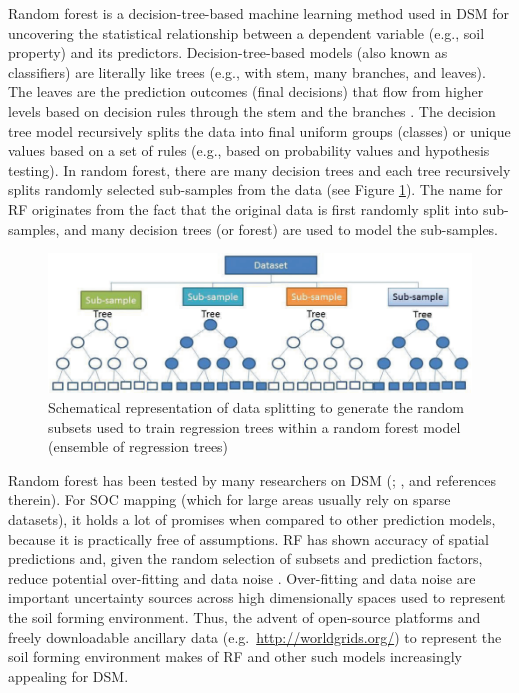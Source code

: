 \documentclass[10pt,b5paper,]{book}
\theoremstyle{definition}
\theoremstyle{definition}
\theoremstyle{definition}
\theoremstyle{remark}
\begin{document}
Random forest is a decision-tree-based machine learning method used in
DSM for uncovering the statistical relationship between a dependent
variable (e.g., soil property) and its predictors. Decision-tree-based
models (also known as classifiers) are literally like trees (e.g., with
stem, many branches, and leaves). The leaves are the prediction outcomes
(final decisions) that flow from higher levels based on decision rules
through the stem and the branches \citep{breiman1984classification}. The
decision tree model recursively splits the data into final uniform
groups (classes) or unique values based on a set of rules (e.g., based
on probability values and hypothesis testing). In random forest, there
are many decision trees and each tree recursively splits randomly
selected sub-samples from the data (see Figure \ref{fig:rfschema}). The
name for RF originates from the fact that the original data is first
randomly split into sub-samples, and many decision trees (or forest) are
used to model the sub-samples.

\begin{figure}

{\centering \includegraphics[width=0.8\linewidth]{images/randomForestconcept} 

}

\caption{Schematical representation of data splitting to generate the random subsets used to train regression trees within a random forest model (ensemble of regression trees)}\label{fig:rfschema}
\end{figure}

Random forest has been tested by many researchers on DSM
(\citet{poggio2013regional}; \citet{rad2014updating}, and references
therein). For SOC mapping (which for large areas usually rely on sparse
datasets), it holds a lot of promises when compared to other prediction
models, because it is practically free of assumptions. RF has shown
accuracy of spatial predictions and, given the random selection of
subsets and prediction factors, reduce potential over-fitting and data
noise \citep{wiesmeier2011digital}. Over-fitting and data noise are
important uncertainty sources across high dimensionally spaces used to
represent the soil forming environment. Thus, the advent of open-source
platforms and freely downloadable ancillary data
(e.g.~\url{http://worldgrids.org/}) to represent the soil forming
environment makes of RF and other such models increasingly appealing for
DSM.
\end{document}
